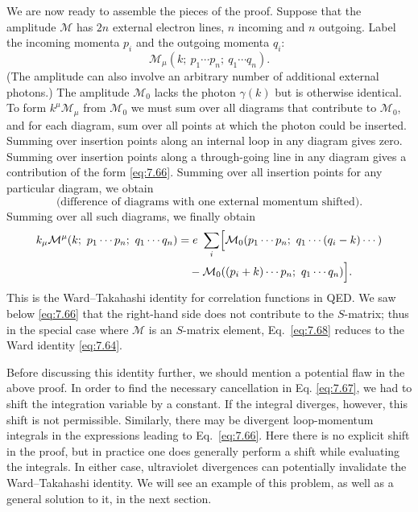 We are now ready to assemble the pieces of the proof.  Suppose that the
amplitude $\mathcal{M}$ has $2n$ external electron lines, $n$ incoming and $n$
outgoing.  Label the incoming momenta $p_i$ and the outgoing momenta
$q_i$:
\begin{equation}
  \mathcal{M}_\mu(k;\ p_1\cdots p_n;\ q_1\cdots q_n) .
\end{equation}
(The amplitude can also involve an arbitrary number of additional external
photons.)  The amplitude $\mathcal{M}_0$ lacks the photon $\gamma(k)$ but is
otherwise identical.  To form $k^\mu\mathcal{M}_\mu$ from $\mathcal{M}_0$ we
must sum over all diagrams that contribute to $\mathcal{M}_0$, and for each
diagram, sum over all points at which the photon could be inserted.  Summing
over insertion points along an internal loop in any diagram gives zero.
Summing over insertion points along a through-going line in any diagram gives
a contribution of the form \eqref{eq:7.66}.  Summing over all insertion
points for any particular diagram, we obtain
\begin{equation}
  \text{(difference of diagrams with one external momentum shifted)} .
\end{equation}
Summing over all such diagrams, we finally obtain
\begin{equation}
  \begin{aligned}
    k_\mu\mathcal{M}^{\mu}(k;\ p_1\cdots p_n;\ q_1\cdots q_n)
    &= e\ \sum_{i} \Bigl[ \mathcal{M}_0(p_1\cdots p_n;\ q_1\cdots
      (q_i-k)\cdots)\\
    &\quad - \mathcal{M}_0((p_i+k)\cdots p_n;\ q_1\cdots q_n) \Bigr].
  \end{aligned}
  \label{eq:7.68}
\end{equation}
This is the Ward--Takahashi identity for correlation functions in QED.  We
saw below \eqref{eq:7.66} that the right-hand side does not contribute to the
$S$-matrix; thus in the special case where $\mathcal{M}$ is an $S$-matrix
element, Eq.~\eqref{eq:7.68} reduces to the Ward identity \eqref{eq:7.64}.

Before discussing this identity further, we should mention a potential flaw in
the above proof.  In order to find the necessary cancellation in Eq.
\eqref{eq:7.67}, we had to shift the integration variable by a constant.  If
the integral diverges, however, this shift is not permissible.  Similarly,
there may be divergent loop-momentum integrals in the expressions leading to
Eq.~\eqref{eq:7.66}.  Here there is no explicit shift in the proof, but in
practice one does generally perform a shift while evaluating the integrals.
In either case, ultraviolet divergences can potentially invalidate the
Ward--Takahashi identity.  We will see an example of this problem, as well as
a general solution to it, in the next section.

